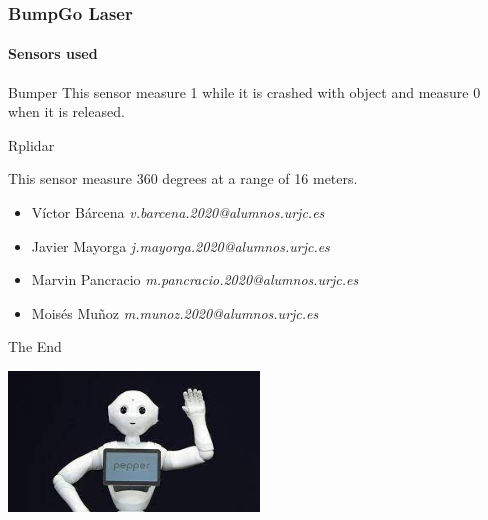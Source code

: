 \documentclass{beamer}
\begin{document}
\begin{frame}
\frametitle{BumpGo Laser}
\framesubtitle{Sensors used}

\begin{block}{Bumper}
	This sensor measure 1 while it is crashed with object and measure 0 when it is 			    released.

\end{block}

\begin{block}{Rplidar}
	
	This sensor measure 360 degrees at a range of 16 meters.
\end{block}

\end{frame}



\begin{frame}
\begin{itemize}
\frametitle{Contributors}
	\item Víctor Bárcena  \textit{v.barcena.2020@alumnos.urjc.es}
	\item Javier Mayorga    \textit{j.mayorga.2020@alumnos.urjc.es}
	\item Marvin Pancracio \textit{m.pancracio.2020@alumnos.urjc.es}
	\item Moisés Muñoz    \textit{m.munoz.2020@alumnos.urjc.es}
\end{itemize}
\end{frame}

\begin{frame}
\Huge{\centerline{The End}}

\centering
\includegraphics[width=0.5\textwidth]{p.jpeg}

\end{frame}

\end{document}
